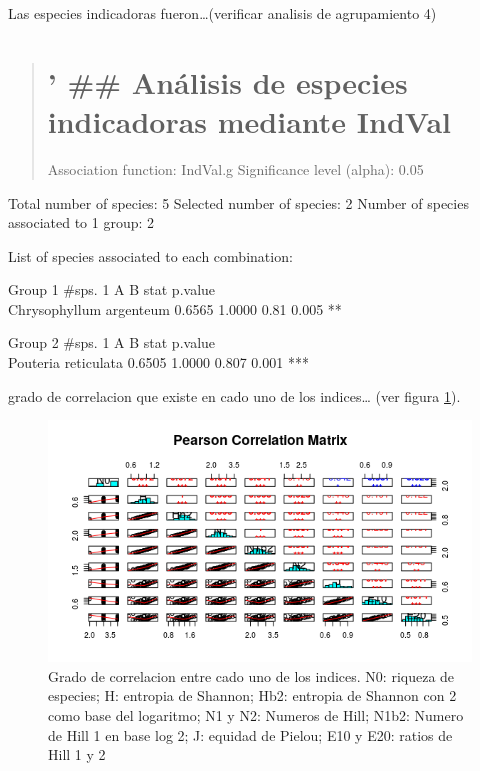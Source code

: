 \documentclass[11pt,]{article}
\begin{document}
{{Las especies indicadoras fueron\ldots{}(verificar analisis de
agrupamiento 4)

\begin{quote}
\section{' \#\# Análisis de especies indicadoras mediante
IndVal}\label{anuxe1lisis-de-especies-indicadoras-mediante-indval}

Association function: IndVal.g Significance level (alpha): 0.05
\end{quote}

Total number of species: 5 Selected number of species: 2 Number of
species associated to 1 group: 2

List of species associated to each combination:

Group 1 \#sps. 1 A B stat p.value\\
Chrysophyllum argenteum 0.6565 1.0000 0.81 0.005 **

Group 2 \#sps. 1 A B stat p.value\\
Pouteria reticulata 0.6505 1.0000 0.807 0.001 ***

grado de correlacion que existe en cado uno de los indices\ldots{} (ver
figura \ref{fig:correlacion_indices}).

\begin{figure}
\centering
\includegraphics[width=1.00000\textwidth]{correlacion_indices.png}
\caption{Grado de correlacion entre cado uno de los indices. N0: riqueza
de especies; H: entropia de Shannon; Hb2: entropia de Shannon con 2 como
base del logaritmo; N1 y N2: Numeros de Hill; N1b2: Numero de Hill 1 en
base log 2; J: equidad de Pielou; E10 y E20: ratios de Hill 1 y 2
\label{fig:correlacion_indices}}
\end{figure}

}}
\end{document}
